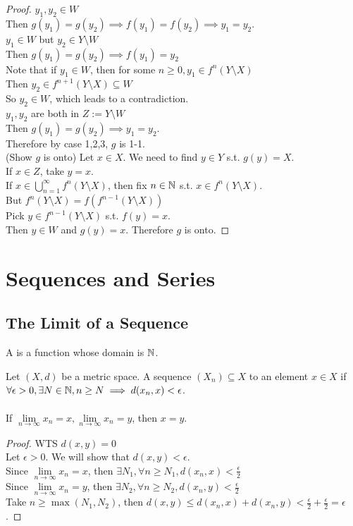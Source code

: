 \documentclass[11pt]{article}
\begin{document}
\begin{proof}
	 $y_1, y_2 \in W$ \\
	Then $g(y_1) = g(y_2) \implies f(y_1) = f(y_2) \implies y_1 = y_2$. \\
	 $y_1 \in W$ but $y_2 \in Y\setminus W$ \\
	Then $g(y_1) = g(y_2) \implies f(y_1) = y_2$ \\
	Note that if $y_1 \in W$, then for some $n \geq 0, y_1 \in f^n(Y \setminus X)$ \\
	Then $y_2 \in f^{n+1}(Y \setminus X) \subseteq W$ \\
	So $y_2 \in W$, which leads to a contradiction. \\
	 $y_1, y_2$ are both in $Z:= Y \setminus W$\\
	Then $g(y_1) = g(y_2) \implies y_1 = y_2$. \\
	Therefore by case 1,2,3, $g$ is 1-1.\\
	(Show $g$ is onto) Let $x \in X$. We need to find $y \in Y$ s.t. $g(y) = X$. \\
	If $x \in Z$, take $y = x$. \\
	If $x \in \bigcup_{n=1}^\infty f^n(Y \setminus X)$, then fix $n \in \mathbb{N}$ s.t. $x \in f^n(Y \setminus X)$. \\
	But $f^n(Y \setminus X) = f(f^{n-1}(Y \setminus X))$ \\
	Pick $y \in f^{n-1}(Y \setminus X)$ s.t. $f(y) = x$. \\
	Then $y \in W$ and $g(y) = x$. Therefore $g$ is onto. 
\end{proof}

\section{Sequences and Series}
\subsection{The Limit of a Sequence}
A  is a function whose domain is $\mathbb{N}$.


Let $(X, d)$ be a metric space. A sequence $(X_n) \subseteq X$  to an element $x \in X$ if $\forall \epsilon > 0, \exists N \in \mathbb{N}, n \geq N \implies d(x_n, x) < \epsilon$. \\\\
 If $\underset{n \rightarrow \infty}{\lim} x_n = x, \underset{n \rightarrow \infty}{\lim} x_n = y$, then $x = y$.
\begin{proof}
	WTS $d(x,y) = 0$ \\
	Let $\epsilon > 0$. We will show that $d(x,y) < \epsilon$. \\
	Since $\underset{n \rightarrow \infty}{\lim} x_n = x$, then $\exists N_1, \forall n \geq N_1, d(x_n, x) < \frac{\epsilon}{2}$ \\
	Since $\underset{n \rightarrow \infty}{\lim} x_n = y$, then $\exists N_2, \forall n \geq N_2, d(x_n, y) < \frac{\epsilon}{2}$ \\
	Take $n \geq \max(N_1, N_2)$, then $d(x,y) \leq d(x_n, x) + d(x_n, y) < \frac{\epsilon}{2} + \frac{\epsilon}{2} = \epsilon$.
\end{proof}
\end{document}
